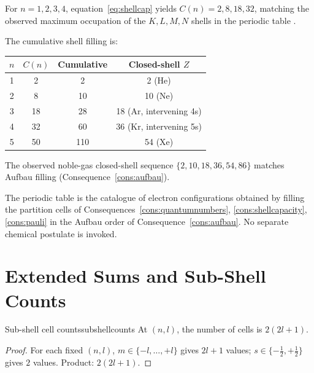 \begin{example}
For $n=1,2,3,4$, equation~\eqref{eq:shellcap} yields $C(n)=2,8,18,32$, matching the observed maximum occupation of the $K,L,M,N$ shells in the periodic table \citep{herzberg1944}.
\end{example}

\begin{example}
The cumulative shell filling is:
\begin{center}
\begin{tabular}{c|c|c|c}
\toprule
$n$ & $C(n)$ & Cumulative & Closed-shell $Z$ \\
\midrule
1 & 2  & 2  & 2 (He) \\
2 & 8  & 10 & 10 (Ne) \\
3 & 18 & 28 & 18 (Ar, intervening 4s) \\
4 & 32 & 60 & 36 (Kr, intervening 5s) \\
5 & 50 & 110 & 54 (Xe) \\
\bottomrule
\end{tabular}
\end{center}
The observed noble-gas closed-shell sequence $\{2,10,18,36,54,86\}$ matches Aufbau filling (Consequence~\ref{cons:aufbau}).
\end{example}

\begin{remark}
The periodic table is the catalogue of electron configurations obtained by filling the partition cells of Consequences~\ref{cons:quantumnumbers}, \ref{cons:shellcapacity}, \ref{cons:pauli} in the Aufbau order of Consequence~\ref{cons:aufbau}. No separate chemical postulate is invoked.
\end{remark}

\section{Extended Sums and Sub-Shell Counts}
\label{sec:subshellcounts}

\begin{consequence}{Sub-shell cell counts}{subshellcounts}
At $(n,l)$, the number of cells is $2(2l+1)$.
\end{consequence}

\begin{proof}
For each fixed $(n,l)$, $m\in\{-l,\ldots,+l\}$ gives $2l+1$ values; $s\in\{-\tfrac{1}{2},+\tfrac{1}{2}\}$ gives $2$ values. Product: $2(2l+1)$.
\end{proof}

